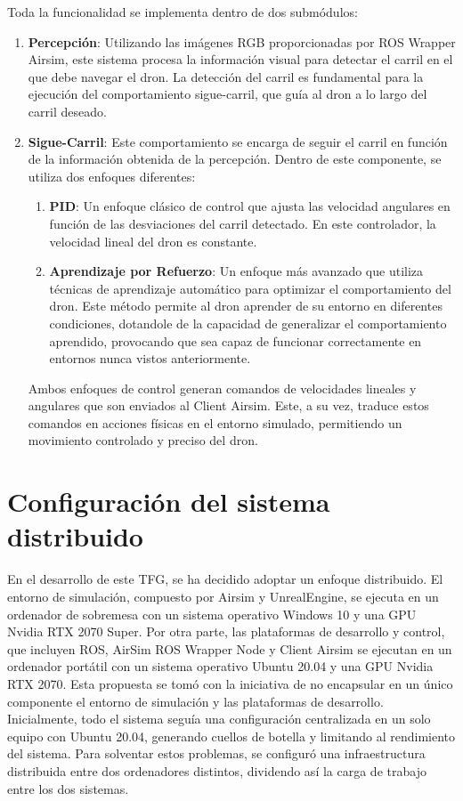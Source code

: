 Toda la funcionalidad se implementa dentro de dos submódulos:
\begin{enumerate}
  \item \textbf{Percepción}: Utilizando las imágenes RGB proporcionadas por ROS Wrapper Airsim, este sistema procesa la información
  visual para detectar el carril en el que debe navegar el dron. La detección del carril es fundamental para la ejecución del comportamiento sigue-carril, que guía al dron 
  a lo largo del carril deseado. 
  \item \textbf{Sigue-Carril}: Este comportamiento se encarga de seguir el carril en función de la información obtenida de la percepción. Dentro de este componente, se 
  utiliza dos enfoques diferentes: 
  \begin{enumerate}
    \item \textbf{PID}: Un enfoque clásico de control que ajusta las velocidad angulares en función de las desviaciones del carril detectado. En este controlador, la velocidad lineal 
    del dron es constante.
    \item \textbf{Aprendizaje por Refuerzo}: Un enfoque más avanzado que utiliza técnicas de aprendizaje automático para optimizar el comportamiento del dron. Este método 
    permite al dron aprender de su entorno en diferentes condiciones, dotandole de la capacidad de generalizar el comportamiento aprendido, provocando que sea capaz de funcionar correctamente
    en entornos nunca vistos anteriormente.

  \end{enumerate}

  Ambos enfoques de control generan comandos de velocidades lineales y angulares que son enviados al Client Airsim. Este, a su vez, traduce estos comandos en acciones físicas 
  en el entorno simulado, permitiendo un movimiento controlado y preciso del dron. 


\end{enumerate}

\section{Configuración del sistema distribuido}
\label{distribución}
En el desarrollo de este TFG, se ha decidido adoptar un enfoque distribuido. El entorno de simulación, compuesto por Airsim y UnrealEngine, se ejecuta en un ordenador de sobremesa con un sistema 
operativo Windows 10 y una GPU Nvidia RTX 2070 Super. Por otra parte, las plataformas de desarrollo y control, que incluyen ROS, AirSim ROS Wrapper Node y Client Airsim se ejecutan en un ordenador
portátil con un sistema operativo Ubuntu 20.04 y una GPU Nvidia RTX 2070.
Esta propuesta se tomó con la iniciativa de no encapsular en un único componente el entorno de simulación y las plataformas de desarrollo. Inicialmente, todo el sistema 
seguía una configuración centralizada en un solo equipo con Ubuntu 20.04, generando cuellos de botella y limitando al rendimiento del sistema. Para solventar estos problemas, 
se configuró una infraestructura distribuida entre dos ordenadores distintos, dividendo así la carga de trabajo entre los dos sistemas.

